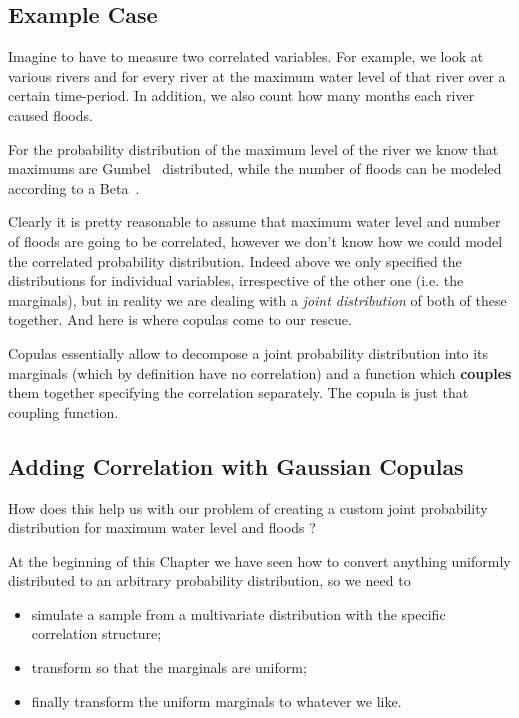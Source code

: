 \subsection{Example Case}
\label{example-problem-case}

Imagine to have to measure two correlated variables. 
For example, we look at various rivers and for every river
at the maximum water level of that river over a certain
time-period. In addition, we also count how many months each river
caused floods.

For the probability distribution of the maximum level of the river we
know that maximums are Gumbel~\cite{bib:gumbel} distributed, 
while the number of floods
can be modeled according to a Beta~\cite{bib:eta}.

Clearly it is pretty reasonable to assume that maximum water level and
number of floods are going to be correlated, however we don't know how
we could model the correlated probability distribution.
Indeed above we only specified the distributions for individual variables, irrespective of the other one (i.e. the marginals), but in reality 
we are dealing with a \emph{joint distribution} of both of these together.
And here is where copulas come to our rescue.

Copulas essentially allow to decompose a joint probability distribution
into its marginals (which by definition have no correlation) and a
function which \textbf{couples} them together 
specifying the correlation separately. The copula is just that coupling
function.

\subsection{Adding Correlation with Gaussian Copulas}
\label{adding-correlation-with-gaussian-copulas}

How does this help us with our problem of creating a custom joint
probability distribution for maximum water level and floods ?

At the beginning of this Chapter we have seen how to convert anything
uniformly distributed to an arbitrary probability distribution, so we
need to
\begin{itemize}
\tightlist
\item
  simulate a sample from a multivariate distribution with the specific correlation structure;
\item
  transform so that the marginals are uniform;
\item
  finally transform the uniform marginals to whatever we like.
\end{itemize}

